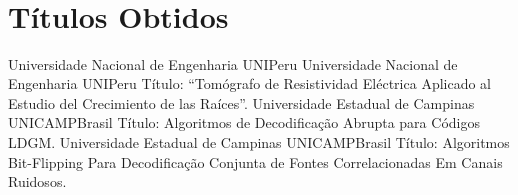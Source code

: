 \documentclass[11pt,a4paper,sans]{moderncv} %
\title{~}
\begin{document}
\makecvtitle %



\section{~}



\section{Títulos Obtidos}

	      {Universidade Nacional de Engenharia}
	      {UNI}{Peru}{}
	      {Universidade Nacional de Engenharia}
	      {UNI}{Peru}
	      {Título: ``Tomógrafo de Resistividad Eléctrica Aplicado al Estudio del Crecimiento de las Raíces''.}
	      {Universidade Estadual de Campinas}
	      {UNICAMP}{Brasil}
	      {Título: Algoritmos de Decodificação Abrupta para Códigos LDGM.}  %
	      {Universidade Estadual de Campinas}
	      {UNICAMP}{Brasil}
	      {Título: Algoritmos Bit-Flipping Para Decodificação Conjunta de Fontes Correlacionadas Em Canais Ruidosos.}

	      
%
\end{document}
